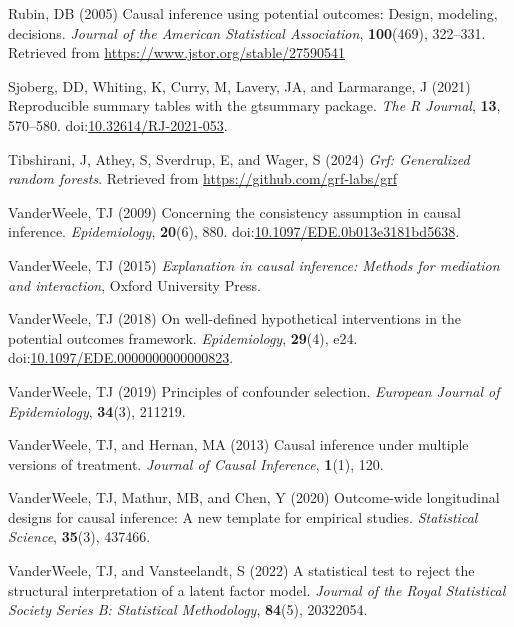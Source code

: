\documentclass[
  singlecolumn]{article}
\newlength{\cslhangindent}
\newenvironment{CSLReferences}[2] %
 {\begin{list}{}{%
  \setlength{\itemindent}{0pt}
  \setlength{\leftmargin}{0pt}
  \setlength{\parsep}{0pt}
  \ifodd #1
   \setlength{\leftmargin}{\cslhangindent}
   \setlength{\itemindent}{-1\cslhangindent}
  \fi
  \setlength{\itemsep}{#2\baselineskip}}}
 {\end{list}}
\begin{document}
\begin{CSLReferences}{1}{0}
Rubin, DB (2005) Causal inference using potential outcomes: Design,
modeling, decisions. \emph{Journal of the American Statistical
Association}, \textbf{100}(469), 322--331. Retrieved from
\url{https://www.jstor.org/stable/27590541}

Sjoberg, DD, Whiting, K, Curry, M, Lavery, JA, and Larmarange, J (2021)
Reproducible summary tables with the gtsummary package. \emph{{The R
Journal}}, \textbf{13}, 570--580.
doi:\href{https://doi.org/10.32614/RJ-2021-053}{10.32614/RJ-2021-053}.

Tibshirani, J, Athey, S, Sverdrup, E, and Wager, S (2024) \emph{Grf:
Generalized random forests}. Retrieved from
\url{https://github.com/grf-labs/grf}

VanderWeele, TJ (2009) Concerning the consistency assumption in causal
inference. \emph{Epidemiology}, \textbf{20}(6), 880.
doi:\href{https://doi.org/10.1097/EDE.0b013e3181bd5638}{10.1097/EDE.0b013e3181bd5638}.

VanderWeele, TJ (2015) \emph{Explanation in causal inference: Methods
for mediation and interaction}, Oxford University Press.

VanderWeele, TJ (2018) On well-defined hypothetical interventions in the
potential outcomes framework. \emph{Epidemiology}, \textbf{29}(4), e24.
doi:\href{https://doi.org/10.1097/EDE.0000000000000823}{10.1097/EDE.0000000000000823}.

VanderWeele, TJ (2019) Principles of confounder selection.
\emph{European Journal of Epidemiology}, \textbf{34}(3), 211219.

VanderWeele, TJ, and Hernan, MA (2013) Causal inference under multiple
versions of treatment. \emph{Journal of Causal Inference},
\textbf{1}(1), 120.

VanderWeele, TJ, Mathur, MB, and Chen, Y (2020) Outcome-wide
longitudinal designs for causal inference: A new template for empirical
studies. \emph{Statistical Science}, \textbf{35}(3), 437466.

VanderWeele, TJ, and Vansteelandt, S (2022) A statistical test to reject
the structural interpretation of a latent factor model. \emph{Journal of
the Royal Statistical Society Series B: Statistical Methodology},
\textbf{84}(5), 20322054.


\end{CSLReferences}
\end{document}
